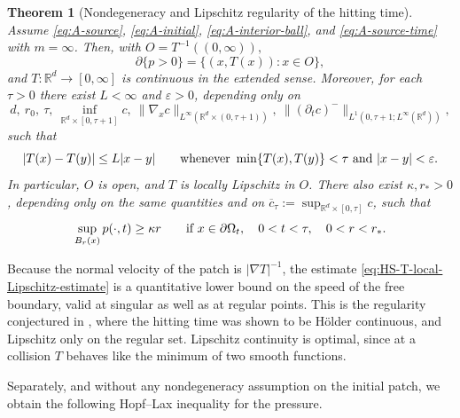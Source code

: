 \documentclass[11pt]{amsart}
\numberwithin{equation}{section}
\numberwithin{figure}{section}
\theoremstyle{plain}
\newtheorem{thm}{Theorem}[section]
\theoremstyle{definition}
\theoremstyle{remark}
\theoremstyle{plain}
\newcommand{\abs}[1]{\lvert #1 \rvert}
\newcommand{\norm}[1]{\lVert #1 \rVert}
\newcommand{\vep}{\varepsilon}
\def\R{\mathbb{R}}
\begin{document}
\begin{thm}[Nondegeneracy and Lipschitz regularity of the hitting time]\label{thm:HS-hitting-time-lipschitz}
Assume \eqref{eq:A-source}, \eqref{eq:A-initial}, \eqref{eq:A-interior-ball}, and \eqref{eq:A-source-time} with $m=\infty$. Then, with $O=T^{-1}((0,\infty)),$
\[
    \partial\{p>0\} =\{(x,T(x)):x\in O\},
\]
and $T:\R^d\to[0,\infty]$ is continuous in the extended sense. Moreover, for each $\tau>0$
there exist $L<\infty$ and $\vep>0$, depending only on
\[
    d,\ r_0,\ \tau,\ \inf_{\R^d\times[0,\tau+1]}c,\
    \norm{\nabla_xc}_{L^\infty(\R^d\times(0,\tau+1))},\
    \norm{(\partial_tc)^-}_{L^1(0,\tau+1;L^\infty(\R^d))},
\]
such that
\begin{equation}\label{eq:HS-T-local-Lipschitz-estimate}
    \abs{T(x)-T(y)}\leq L\abs{x-y}
    \qquad\hbox{whenever }\min\{T(x),T(y)\}<\tau\hbox{ and }\abs{x-y}<\vep .
\end{equation}
In particular, $O$ is open, and $T$ is locally Lipschitz in $O$.
There also exist $\kappa,r_*>0$, depending only on the same quantities and on
$\overline c_\tau:=\sup_{\R^d\times[0,\tau]}c$, such that
\begin{equation}\label{eq:HS-pressure-linear-nondegeneracy}
    \sup_{B_r(x)}p(\cdot,t)\geq\kappa r
    \qquad\hbox{if }x\in\partial\Omega_t,\quad 0<t<\tau,\quad 0<r<r_*.
\end{equation}

\end{thm}

Because the normal velocity of the patch is $\abs{\nabla T}^{-1}$, the estimate
\eqref{eq:HS-T-local-Lipschitz-estimate} is a quantitative lower bound on the speed of the free boundary,
valid at singular as well as at regular points. This is the regularity conjectured in
\cite{CJK25}, where the hitting time was shown to be H\"older continuous, and Lipschitz
only on the regular set. Lipschitz
continuity is optimal, since at a collision $T$ behaves like the minimum
of two smooth functions.


Separately, and without any nondegeneracy assumption on the initial patch, we obtain the
following Hopf--Lax inequality for the pressure.
\end{document}
